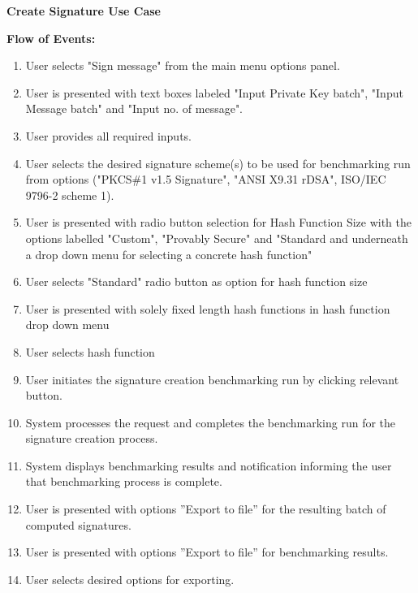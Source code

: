 \documentclass[]{final_report}
\theoremstyle{definition}
\begin{document}
\textbf{Create Signature Use Case}

\noindent\textbf{Flow of Events:}
\begin{enumerate}
    \item User selects "Sign message" from the main menu options panel.
    \item User is presented with text boxes labeled "Input Private Key batch", "Input Message batch" and "Input no. of message".
    \item User provides all required inputs.
    \item User selects the desired signature scheme(s) to be used for benchmarking run from options ("PKCS\#1 v1.5 Signature", "ANSI X9.31 rDSA", ISO\slash IEC 9796-2 scheme 1).
      \item User is presented with radio button selection for Hash Function Size with the options labelled "Custom", "Provably Secure" and "Standard and underneath a drop down menu for selecting a concrete hash function"
        \item User selects "Standard" radio button as option for hash function size
         \item User is presented with solely fixed length hash functions in hash function drop down menu
          \item User selects hash function
          \item User initiates the signature creation benchmarking run by clicking relevant button.
  \item System processes the request and completes the benchmarking run for the signature creation process.
      \item System displays benchmarking results and notification informing the user that benchmarking process is complete.
      \item User is presented with options ”Export to file” for the resulting batch of computed signatures.
       \item User is presented with options ”Export to file” for benchmarking results.
       \item User selects desired options for exporting.
\end{enumerate}
\end{document}
